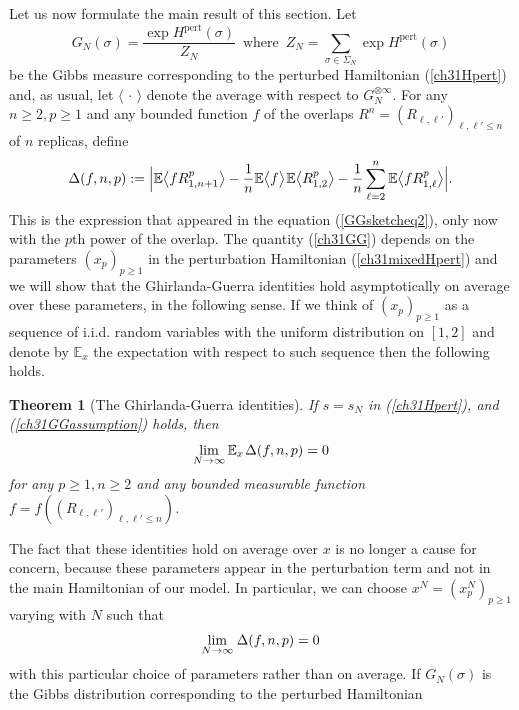 \documentclass[12pt]{article}
\newcommand{\smsp}{\hspace{0.3mm}}
\newcommand{\e}{\mathbb{E}}
\newcommand{\la}{\langle}
\newcommand{\ra}{\rangle}
\newtheorem{theorem}{Theorem}
\theoremstyle{nonumberplain}
\begin{document}
\medskip
\noindent
Let us now formulate the main result of this section. Let 
\begin{equation}
G_N(\sigma) = \frac{\exp  H^{\mathrm{pert}}(\sigma)}{Z_N}
\,\mbox{ where }\,
Z_N = \sum_{\sigma\in\Sigma_{N}} \exp  H^{\mathrm{pert}}(\sigma)
\label{ch31GNpert}
\end{equation}
be the Gibbs measure corresponding to the perturbed Hamiltonian (\ref{ch31Hpert}) and, as usual, let $\la\,\cdot\, \ra$ denote the average with respect to $G_N^{\otimes \infty}$. For any $n\geq 2, p\geq 1$ and any bounded function $f$ of the overlaps $R^n=(R_{\ell,\ell'})_{ \ell,\ell'\leq n}$ of $n$ replicas, define
\begin{equation}
\Delta(f,n,p) := 
\Bigl|
\e  \bigl\la f R_{1,n+1}^p \bigr\ra -  \frac{1}{n}\e \bigl\la f \bigr\ra \smsp \e\bigl\la R_{1,2}^p\bigr\ra - \frac{1}{n}\sum_{\ell=2}^{n}\e \bigl\la f R_{1,\ell}^p\bigr\ra
\Bigr|.
\label{ch31GG}
\end{equation}
This is the expression that appeared in the equation (\ref{GGsketcheq2}), only now with the $p$th power of the overlap. The quantity (\ref{ch31GG}) depends on the parameters $(x_p)_{p\geq 1}$ in the perturbation Hamiltonian (\ref{ch31mixedHpert}) and we will show that the Ghirlanda-Guerra identities hold asymptotically on average over these parameters, in the following sense. If we think of $(x_p)_{p\geq 1}$ as a sequence of i.i.d. random variables with the uniform distribution on $[1,2]$ and denote by $\e_x$ the expectation with respect to such sequence then the following holds.
\begin{theorem}[The Ghirlanda-Guerra identities]\label{ch31ThGG} 
If $s=s_N$ in (\ref{ch31Hpert}), and (\ref{ch31GGassumption}) holds, then
\begin{equation}
\lim_{N\to\infty} \e_x \smsp \Delta(f,n,p) = 0
\label{ch31GGxlim}
\end{equation} 
for any $p\geq 1, n\geq 2$ and any bounded measurable function $f=f((R_{\ell,\ell'})_{\ell,\ell'\leq n})$.
\end{theorem}
The fact that these identities hold on average over $x$ is no longer a cause for concern, because these parameters appear in the perturbation term and not in the main Hamiltonian of our model. In particular, we can choose $x^N = (x_p^N)_{p\geq 1}$ varying with $N$ such that
\begin{equation}
\lim_{N\to\infty} \smsp \Delta(f,n,p) = 0
\end{equation} 
with this particular choice of parameters rather than on average. If $G_N(\sigma)$ is the Gibbs distribution corresponding to the perturbed Hamiltonian 
\end{document}
